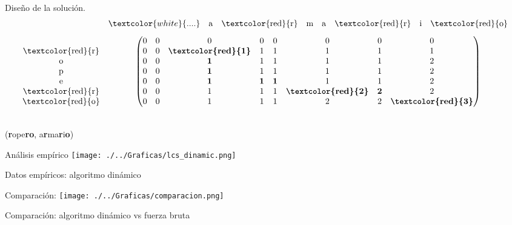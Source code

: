 \documentclass[10pt, xcolor=table]{beamer}
\begin{document}
\begin{frame}[fragile]{Diseño de la solución. }
$$
\begin{matrix}
 & \begin{matrix} \textcolor{white}{....}\vspace{0.3cm}&\text{{a}} & \text{\textcolor{red}{r}} & \text{{m}} & \text{{a}} & \text{\textcolor{red}{r}} & \text{{i}} & \text{\textcolor{red}{o}} \end{matrix} \\
\begin{matrix}\\ \text{\textcolor{red}{r}}\\\text{{o}}\\\text{{p}}\\\text{{e}}\\\text{\textcolor{red}{r}}\\\text{{\textcolor{red}{o}}} \end{matrix} & \left(\begin{matrix}
0 & 0 & 0 &0&0&0&0&0\\
0&0&\textbf{\textcolor{red}{1}}&1&1&1&1&1\\
0&0&\textbf{1}&1&1&1&1&2\\
0&0&\textbf{1}&1&1&1&1&2\\
0&0&\textbf{1}&\textbf{1}&\textbf{1}&1&1&2\\
0&0&1&1&1&\textbf{\textcolor{red}{2}}&\textbf{2}&2\\
0&0&1&1&1&2&2&\textbf{\textcolor{red}{3}}\\
\end{matrix}\right)
\end{matrix}
$$

\begin{center}
	\\	
	(\textbf{r}ope\textbf{ro}, a\textbf{r}ma\textbf{r}i\textbf{o})
\end{center}
\end{frame}

\begin{frame}[fragile]{Análisis empírico}
\texttt{[image: ./../Graficas/lcs\_dinamic.png]}
\begin{center}
	\footnotesize{Datos empíricos: algoritmo dinámico}
\end{center}
\end{frame}

\begin{frame}[fragile]{Comparación: }
\texttt{[image: ./../Graficas/comparacion.png]}
\begin{center}
	\footnotesize{Comparación: algoritmo dinámico vs fuerza bruta}
\end{center}
\end{frame}
\end{document}
